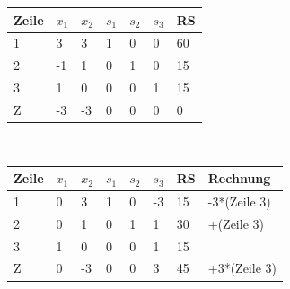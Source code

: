 \begin{table}[!ht]
\begin{tabular}{|l|l|l|l|l|l|l|}
\hline
\rowcolor[HTML]{C0C0C0} 
Zeile                     & $x_1$                         & $x_2$                        & $s_1$                        & $s_2$                        & $s_3$                        & RS \\ \hline
\cellcolor[HTML]{C0C0C0}1 & \cellcolor[HTML]{FFFFFF}3  & \cellcolor[HTML]{FFFFFF}3 & \cellcolor[HTML]{FFFFFF}1 & \cellcolor[HTML]{FFFFFF}0 & \cellcolor[HTML]{FFFFFF}0 & 60 \\ \hline
\cellcolor[HTML]{C0C0C0}2 & \cellcolor[HTML]{FFFFFF}-1 & \cellcolor[HTML]{FFFFFF}1 & \cellcolor[HTML]{FFFFFF}0 & \cellcolor[HTML]{FFFFFF}1 & \cellcolor[HTML]{FFFFFF}0 & 15 \\ \hline
\cellcolor[HTML]{C0C0C0}3 & \cellcolor[HTML]{DAE8FC}1  & \cellcolor[HTML]{FFFFFF}0 & \cellcolor[HTML]{FFFFFF}0 & \cellcolor[HTML]{FFFFFF}0 & \cellcolor[HTML]{FFFFFF}1 & 15 \\ \hline
\cellcolor[HTML]{C0C0C0}Z & -3                         & -3                        & 0                         & 0                         & 0                         & 0  \\ \hline
\end{tabular}
\end{table}
\\
\begin{table}[!ht]
\begin{tabular}{|l|l|l|l|l|l|l|l|}
\hline
\rowcolor[HTML]{C0C0C0} 
Zeile                     & $x_1$                        & $x_2$                        & $s_1$                        & $s_2$                        & $s_3$                         & RS & Rechnung     \\ \hline
\cellcolor[HTML]{C0C0C0}1 & \cellcolor[HTML]{FFFFFF}0 & \cellcolor[HTML]{CBCEFB}3 & \cellcolor[HTML]{FFFFFF}1 & \cellcolor[HTML]{FFFFFF}0 & \cellcolor[HTML]{FFFFFF}-3 & 15 & -3*(Zeile 3) \\ \hline
\cellcolor[HTML]{C0C0C0}2 & \cellcolor[HTML]{FFFFFF}0 & \cellcolor[HTML]{FFFFFF}1 & \cellcolor[HTML]{FFFFFF}0 & \cellcolor[HTML]{FFFFFF}1 & \cellcolor[HTML]{FFFFFF}1  & 30 & +(Zeile 3)   \\ \hline
\cellcolor[HTML]{C0C0C0}3 & \cellcolor[HTML]{FFFFFF}1 & \cellcolor[HTML]{FFFFFF}0 & \cellcolor[HTML]{FFFFFF}0 & \cellcolor[HTML]{FFFFFF}0 & \cellcolor[HTML]{FFFFFF}1  & 15 &              \\ \hline
\cellcolor[HTML]{C0C0C0}Z & 0                         & -3                        & 0                         & 0                         & 3                          & 45 & +3*(Zeile 3) \\ \hline
\end{tabular}
\end{table}
